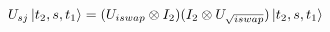\documentclass[preview, border={5pt,5pt,5pt,5pt}]{standalone}
\begin{document}
$
U_{sj}\ket{t_2,s,t_1} = (U_{iswap} \otimes I_2)(I_2 \otimes U_{\sqrt{iswap}})\ket{t_2,s,t_1}
$
\end{document}
